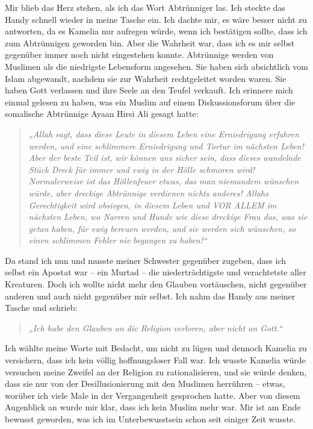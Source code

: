 \documentclass[12pt]{memoir}
\begin{document}
Mir blieb das Herz stehen, als ich das Wort Abtrünniger las.
Ich steckte das Handy schnell wieder in meine Tasche ein.
Ich dachte mir, es wäre besser nicht zu antworten,
da es Kamelia nur aufregen würde, wenn ich bestätigen sollte,
dass ich zum Abtrünnigen geworden bin.
Aber die Wahrheit war, dass ich es mir selbst gegenüber
immer noch nicht eingestehen konnte.
Abtrünnige werden von Muslimen als die niedrigste Lebensform angesehen.
Sie haben sich absichtlich vom Islam abgewandt,
nachdem sie zur Wahrheit rechtgeleitet worden waren.
Sie haben Gott verlassen und ihre Seele an den Teufel verkauft.
Ich erinnere mich einmal gelesen zu haben,
was ein Muslim auf einem Diskussionsforum
über die somalische Abtrünnige Ayaan Hirsi Ali gesagt hatte:

\begin{quote}
\itshape
„Allah sagt, dass diese Leute in diesem Leben
eine Erniedrigung erfahren werden,
und eine schlimmere Erniedrigung und Tortur im nächsten Leben!
Aber der beste Teil ist, wir können uns sicher sein,
dass dieses wandelnde Stück Dreck für immer
und ewig in der Hölle schmoren wird!
Normalerweise ist das Höllenfeuer etwas,
das man niemandem wünschen würde,
aber dreckige Abtrünnige verdienen nichts anderes!
Allahs Gerechtigkeit wird obsiegen,
in diesem Leben und VOR ALLEM im nächsten Leben,
wo Narren und Hunde wie diese dreckige Frau
das, was sie getan haben, für ewig bereuen werden,
und sie werden sich wünschen,
so einen schlimmen Fehler nie begangen zu haben!“
\end{quote}

Da stand ich nun und musste meiner Schwester gegenüber zugeben,
dass ich selbst ein Apostat war – ein Murtad –
die niederträchtigste und verachtetste aller Kreaturen.
Doch ich wollte nicht mehr den Glauben vortäuschen,
nicht gegenüber anderen und auch nicht gegenüber mir selbst.
Ich nahm das Handy aus meiner Tasche und schrieb:

\begin{quote}
\emph{„Ich habe den Glauben an die Religion verloren, aber nicht an Gott.“}
\end{quote}

Ich wählte meine Worte mit Bedacht,
um nicht zu lügen und dennoch Kamelia zu versichern,
dass ich kein völlig hoffnungsloser Fall war.
Ich wusste Kamelia würde versuchen meine Zweifel
an der Religion zu rationalisieren, und sie würde denken,
dass sie nur von der Desillusionierung mit den Muslimen herrühren –
etwas, worüber ich viele Male in der Vergangenheit gesprochen hatte.
Aber von diesem Augenblick an wurde mir klar,
dass ich kein Muslim mehr war.
Mir ist am Ende bewusst geworden,
was ich im Unterbewusstsein schon seit einiger Zeit wusste.
\end{document}
